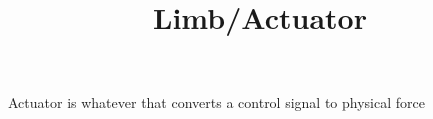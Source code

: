 \documentclass[a4paper]{article}
\title{Limb/Actuator}
\date{}
\begin{document}
    \maketitle
    Actuator is whatever that converts a control signal to physical force
\end{document}
